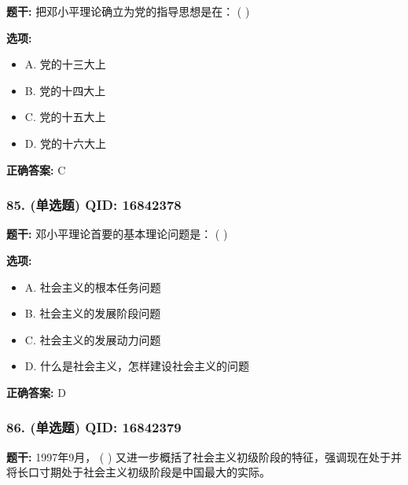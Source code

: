\documentclass[12pt,UTF8]{ctexart}
\begin{document}
\textbf{题干:}
把邓小平理论确立为党的指导思想是在： ( )

\textbf{选项:}
\begin{itemize}[leftmargin=*]

  \item A. 党的十三大上

  \item B. 党的十四大上

  \item C. 党的十五大上

  \item D. 党的十六大上

\end{itemize}

\textbf{正确答案:}
C

\vspace{0.3em}\hrulefill\vspace{0.7em}

\subsubsection*{85. (单选题) \small QID: 16842378}

\textbf{题干:}
邓小平理论首要的基本理论问题是： ( )

\textbf{选项:}
\begin{itemize}[leftmargin=*]

  \item A. 社会主义的根本任务问题

  \item B. 社会主义的发展阶段问题

  \item C. 社会主义的发展动力问题

  \item D. 什么是社会主义，怎样建设社会主义的问题

\end{itemize}

\textbf{正确答案:}
D

\vspace{0.3em}\hrulefill\vspace{0.7em}

\subsubsection*{86. (单选题) \small QID: 16842379}

\textbf{题干:}
1997年9月， ( ) 又进一步概括了社会主义初级阶段的特征，强调现在处于并将长口寸期处于社会主义初级阶段是中国最大的实际。
\end{document}
